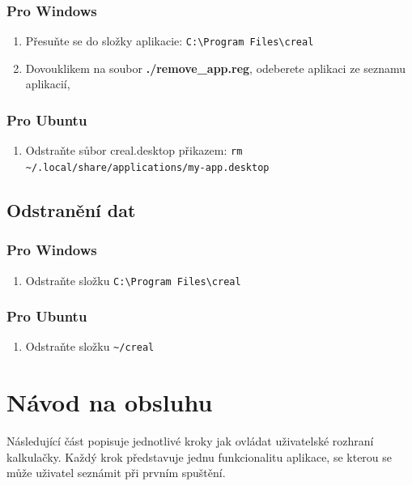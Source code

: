 \documentclass[12pt]{article}
\begin{document}
\subsubsection{Pro Windows}

\begin{enumerate}
    \item Přesuňte se do složky aplikacie: \verb|C:\Program Files\creal| 
    \item Dovouklikem na soubor \textbf{./remove\_app.reg}, odeberete aplikaci ze seznamu aplikacií,
\end{enumerate}

\subsubsection{Pro Ubuntu}
\begin{enumerate}
    \item Odstraňte sůbor creal.desktop přikazem: \verb|rm ~/.local/share/applications/my-app.desktop|
\end{enumerate}

\subsection{Odstranění dat}
\subsubsection{Pro Windows}
\begin{enumerate}
    \item Odstraňte složku \verb|C:\Program Files\creal|
\end{enumerate}

\subsubsection{Pro Ubuntu}
\begin{enumerate}
    \item Odstraňte složku \verb|~/creal|
\end{enumerate}

\clearpage
\newpage

\section{Návod na obsluhu}

Následující část popisuje jednotlivé kroky jak ovládat uživatelské rozhraní kalkulačky. Každý krok představuje jednu funkcionalitu aplikace, se kterou se může uživatel seznámit při prvním spuštění.
\end{document}
